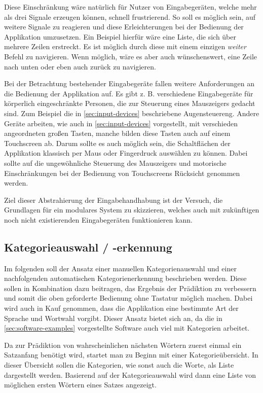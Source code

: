         Diese Einschränkung wäre natürlich für Nutzer von Eingabegeräten, welche mehr als drei Signale erzeugen können, schnell frustrierend. So soll es möglich sein, auf weitere Signale zu reagieren und diese Erleichterungen bei der Bedienung der Applikation umzusetzen. Ein Beispiel hierfür wäre eine Liste, die sich über mehrere Zeilen erstreckt. Es ist möglich durch diese mit einem einzigen \emph{weiter} Befehl zu navigieren. Wenn möglich, wäre es aber auch wünschenswert, eine Zeile nach unten oder eben auch zurück zu navigieren.
        
        Bei der Betrachtung bestehender Eingabegeräte fallen weitere Anforderungen an die Bedienung der Applikation auf. Es gibt z. B. verschiedene Eingabegeräte für körperlich eingeschränkte Personen, die zur Steuerung eines Mauszeigers gedacht sind. Zum Beispiel die in \autoref{sec:input-devices} beschriebene Augensteuereng. Andere Geräte arbeiten, wie auch in \autoref{sec:input-devices} vorgestellt, mit verschieden angeordneten großen Tasten, manche bilden diese Tasten auch auf einem Touchscreen ab. Darum sollte es auch möglich sein, die Schaltflächen der Applikation klassisch per Maus oder Fingerdruck auswählen zu können. Dabei sollte auf die ungewöhnliche Steuerung des Mauszeigers und motorische Einschränkungen bei der Bedienung von Touchscreens Rücksicht genommen werden.
        
        Ziel dieser Abstrahierung der Eingabehandhabung ist der Versuch, die Grundlagen für ein modulares System zu skizzieren, welches auch mit zukünftigen noch nicht existierenden Eingabegeräten funktionieren kann.
        
	\subsection{Kategorieauswahl / -erkennung}
    \label{sec:requirements_categories}
    
    	Im folgenden soll der Ansatz einer manuellen Kategorienauswahl und einer nachfolgenden automatischen Kategorienerkennung beschrieben werden. Diese sollen in Kombination dazu beitragen, das Ergebnis der Prädiktion zu verbessern und somit die oben geforderte Bedienung ohne Tastatur möglich machen. Dabei wird auch in Kauf genommen, dass die Applikation eine bestimmte Art der Sprache und Wortwahl vorgibt. Dieser Ansatz bietet sich an, da die in \autoref{sec:software-examples} vorgestellte Software auch viel mit Kategorien arbeitet.
        
    	Da zur Prädiktion von wahrscheinlichen nächsten Wörtern zuerst einmal ein Satzanfang benötigt wird, startet man zu Beginn mit einer Kategorieübersicht. In dieser Übersicht sollen die Kategorien, wie sonst auch die Worte, als Liste dargestellt werden. Basierend auf der Kategorieauswahl wird dann eine Liste von möglichen ersten Wörtern eines Satzes angezeigt. 
        
